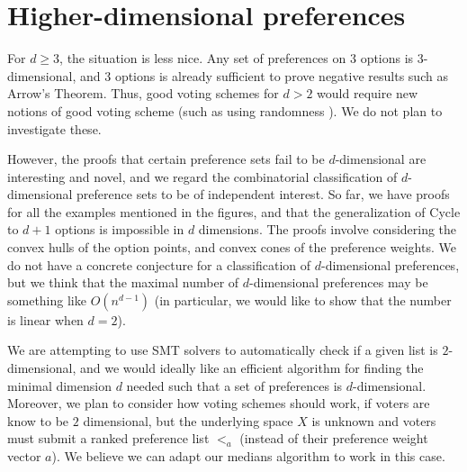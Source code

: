 \documentclass[12pt]{article}
\newcommand{\1}[1]{\mathds{1}[{#1}]}
\begin{document}
\section*{Higher-dimensional preferences}

  For $d\ge 3$, the situation is less nice.
  Any set of preferences on $3$ options is $3$-dimensional,
  and $3$ options is already sufficient to prove negative
  results such as Arrow's Theorem.
  Thus, good voting schemes for $d > 2$ would require new notions
  of good voting scheme (such as using randomness \cite{AgtBookNoMoney}).
  We do not plan to investigate these.

  However, the proofs that certain preference sets fail to be $d$-dimensional
  are interesting and novel, and we regard the combinatorial classification
  of $d$-dimensional preference sets to be of independent interest.
  So far, we have proofs for all the examples mentioned in the figures,
  and that the generalization of {\sc Cycle} to $d+1$ options
  is impossible in $d$ dimensions.
  The proofs involve considering the convex hulls of the option points,
  and convex cones of the preference weights.
  We do not have a concrete conjecture for a classification of $d$-dimensional
  preferences, but we think that the maximal number of $d$-dimensional
  preferences may be something like $O(n^{d-1})$
  (in particular, we would like to show that the number is linear
  when $d=2$).

  We are attempting to use SMT solvers to automatically check
  if a given list is $2$-dimensional, and we would ideally like
  an efficient algorithm for finding the minimal dimension $d$
  needed such that a set of preferences is $d$-dimensional.
  Moreover, we plan to consider how voting schemes should work,
  if voters are know to be $2$ dimensional, but the underlying space
  $X$ is unknown and voters must submit a ranked preference list $<_a$
  (instead of their preference weight vector $a$).
  We believe we can adapt our medians algorithm to work in this case.

  {}
  
\end{document}
